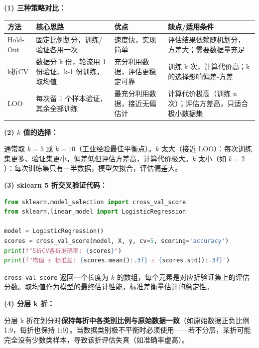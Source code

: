 \documentclass[a4paper,11pt]{ctexart}
\begin{document}
\begin{solutionbox}[参考答案与详细解析]
    \textbf{(1) 三种策略对比：}
    \begin{center}
    \begin{tabular}{p{2.5cm} p{3cm} p{3.5cm} p{3.5cm}}
        \toprule
        方法 & 核心思路 & 优点 & 缺点/适用条件 \\
        \midrule
        Hold-Out & 固定比例划分，训练/验证各用一次 & 速度快，实现简单 & 评估结果依赖随机划分，方差大；需要数据量充足 \\[0.8em]
        k折CV & 数据分 k 份，轮流用 1 份验证、k-1 份训练，取均值 & 充分利用数据，评估更稳定可靠 & 训练 k 次，计算代价高；k 的选择影响偏差-方差 \\[0.8em]
        LOO & 每次留 1 个样本验证，其余全部训练 & 最充分利用数据，接近无偏估计 & 计算代价极高（训练 n 次）；评估方差高，只适合极小数据集 \\
        \bottomrule
    \end{tabular}
    \end{center}

    \textbf{(2) $k$ 值的选择：}

    通常取 $k=5$ 或 $k=10$（工业经验最佳平衡点）。$k$ 太大（接近 LOO）：每次训练集更多、验证集更小，偏差低但评估方差高，计算代价极大。$k$ 太小（如 $k=2$）：每次训练集只有一半数据，模型欠拟合，评估偏差大。

    \textbf{(3) sklearn 5 折交叉验证代码：}
    \begin{lstlisting}[language=Python]
from sklearn.model_selection import cross_val_score
from sklearn.linear_model import LogisticRegression

model = LogisticRegression()
scores = cross_val_score(model, X, y, cv=5, scoring='accuracy')
print(f"5折CV各折准确率: {scores}")
print(f"均值 ± 标准差: {scores.mean():.3f} ± {scores.std():.3f}")
    \end{lstlisting}
    \texttt{cross\_val\_score} 返回一个长度为 $k$ 的数组，每个元素是对应折验证集上的评估分数。取均值作为模型的最终估计性能，标准差衡量估计的稳定性。

    \textbf{(4) 分层 k 折：}

    分层 k 折在划分时\textbf{保持每折中各类别比例与原始数据一致}（如原始数据正负比例 1:9，每折也保持 1:9）。当数据类别极不平衡时必须使用——若不分层，某折可能完全没有少数类样本，导致该折评估失真（如准确率虚高）。
\end{solutionbox}
\end{document}
